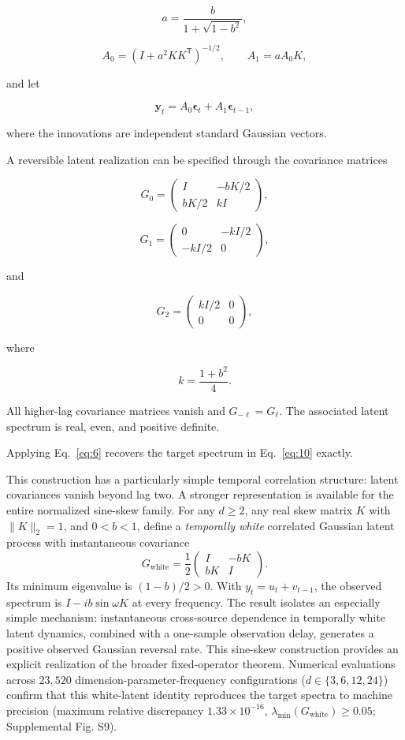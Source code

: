 \documentclass[aps,pre,reprint,amsmath,amssymb,superscriptaddress]{revtex4-2}
\begin{document}
\[
a=\frac{b}{1+\sqrt{1-b^2}},
\]

\[
A_0=(I+a^2KK^{\mathsf T})^{-1/2},
\qquad
A_1=aA_0K,
\]

and let

\[
\mathbf y_t
=
A_0\boldsymbol\epsilon_t+
A_1\boldsymbol\epsilon_{t-1},
\]

where the innovations are independent standard Gaussian vectors.

A reversible latent realization can be specified through the covariance matrices

\[
G_0=
\begin{pmatrix}
I&-bK/2\\
bK/2&kI
\end{pmatrix},
\]

\[
G_1=
\begin{pmatrix}
0&-kI/2\\
-kI/2&0
\end{pmatrix},
\]

and

\[
G_2=
\begin{pmatrix}
kI/2&0\\
0&0
\end{pmatrix},
\]

where

\[
k=\frac{1+b^2}{4}.
\]

All higher-lag covariance matrices vanish and \(G_{-\ell}=G_\ell\). The associated latent spectrum is real, even, and positive definite.

Applying Eq.~\eqref{eq:6} recovers the target spectrum in Eq.~\eqref{eq:10} exactly.

This construction has a particularly simple temporal correlation structure: latent covariances vanish beyond lag two. A stronger representation is available for the entire normalized sine-skew family. For any $d\ge2$, any real skew matrix $K$ with $\|K\|_2=1$, and $0<b<1$, define a \emph{temporally white} correlated Gaussian latent process with instantaneous covariance
\begin{equation}\label{eq:white_lift}
 G_{\mathrm{white}}=\frac12
 \begin{pmatrix}I&-bK\\ bK&I\end{pmatrix}.
\end{equation}
Its minimum eigenvalue is $(1-b)/2>0$. With $y_t=u_t+v_{t-1}$, the observed spectrum is $I-ib\sin\omega K$ at every frequency. The result isolates an especially simple mechanism: instantaneous cross-source dependence in temporally white latent dynamics, combined with a one-sample observation delay, generates a positive observed Gaussian reversal rate. This sine-skew construction provides an explicit realization of the broader fixed-operator theorem. Numerical evaluations across $23,520$ dimension-parameter-frequency configurations ($d \in \{3, 6, 12, 24\}$) confirm that this white-latent identity reproduces the target spectra to machine precision (maximum relative discrepancy $1.33 \times 10^{-16}$, $\lambda_{\min}(G_{\mathrm{white}}) \ge 0.05$; Supplemental Fig. S9).
\end{document}
